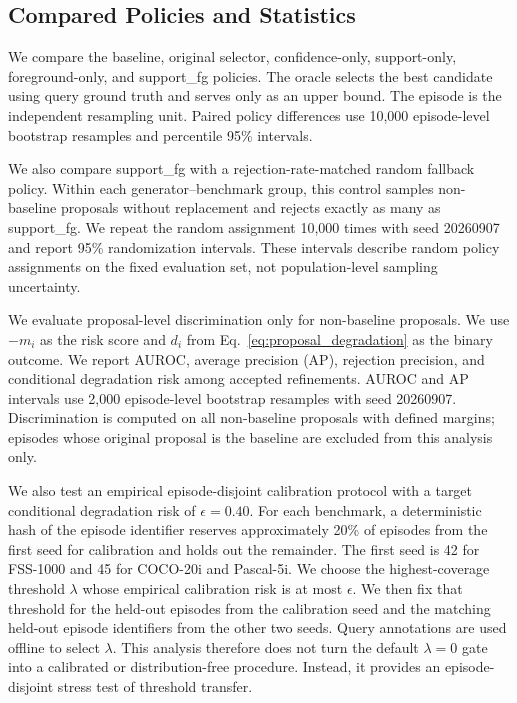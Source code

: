 \documentclass{CVM}
\begin{document}
\subsection{Compared Policies and Statistics}

We compare the baseline, original selector, confidence-only, support-only, foreground-only, and support\_fg policies. The oracle selects the best candidate using query ground truth and serves only as an upper bound. The episode is the independent resampling unit. Paired policy differences use 10,000 episode-level bootstrap resamples and percentile 95\% intervals.

We also compare support\_fg with a rejection-rate-matched random fallback policy. Within each generator--benchmark group, this control samples non-baseline proposals without replacement and rejects exactly as many as support\_fg. We repeat the random assignment 10,000 times with seed 20260907 and report 95\% randomization intervals. These intervals describe random policy assignments on the fixed evaluation set, not population-level sampling uncertainty.

We evaluate proposal-level discrimination only for non-baseline proposals. We use $-m_i$ as the risk score and $d_i$ from Eq.~\eqref{eq:proposal_degradation} as the binary outcome. We report AUROC, average precision (AP), rejection precision, and conditional degradation risk among accepted refinements. AUROC and AP intervals use 2,000 episode-level bootstrap resamples with seed 20260907. Discrimination is computed on all non-baseline proposals with defined margins; episodes whose original proposal is the baseline are excluded from this analysis only.

We also test an empirical episode-disjoint calibration protocol with a target conditional degradation risk of $\epsilon=0.40$. For each benchmark, a deterministic hash of the episode identifier reserves approximately 20\% of episodes from the first seed for calibration and holds out the remainder. The first seed is 42 for FSS-1000 and 45 for COCO-20i and Pascal-5i. We choose the highest-coverage threshold $\lambda$ whose empirical calibration risk is at most $\epsilon$. We then fix that threshold for the held-out episodes from the calibration seed and the matching held-out episode identifiers from the other two seeds. Query annotations are used offline to select $\lambda$. This analysis therefore does not turn the default $\lambda=0$ gate into a calibrated or distribution-free procedure. Instead, it provides an episode-disjoint stress test of threshold transfer.
\end{document}
